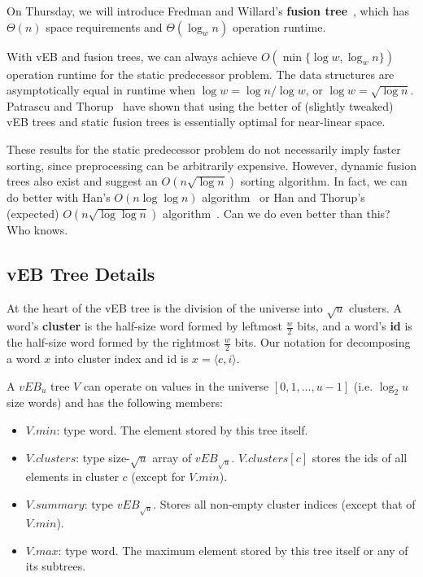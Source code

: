 \documentclass[11pt]{article}
\def\<{\langle}
\def\>{\rangle}
\begin{document}
On Thursday, we will introduce Fredman and Willard's \textbf{fusion tree}~\cite{fwJCS93}, which has $\Theta(n)$ space requirements and $\Theta(\log_w n)$ operation runtime.

With vEB and fusion trees, we can always achieve $O(\min\{\log w, \log_w n\})$ operation runtime for the static predecessor problem. The data structures are asymptotically equal in runtime when $\log w = \log n / \log w$, or $\log w = \sqrt{\log n}$. Patrascu and Thorup~\cite{ptSTOC06, ptSODA07} have shown that using the better of (slightly tweaked) vEB trees and static fusion trees is essentially optimal for near-linear space.

These results for the static predecessor problem do not necessarily imply faster sorting, since preprocessing can be arbitrarily expensive. However, dynamic fusion trees also exist and suggest an $O(n \sqrt{\log n})$ sorting algorithm. In fact, we can do better with Han's $O(n \log \log n)$ algorithm~\cite{hanSTOC02} or Han and Thorup's (expected) $O(n \sqrt{\log \log n})$ algorithm~\cite{htFOCS02}. Can we do even better than this? Who knows.

\subsection{vEB Tree Details}
At the heart of the vEB tree is the division of the universe into $\sqrt{u}$ clusters. A word's \textbf{cluster} is the half-size word formed by leftmost $\frac{w}{2}$ bits, and a word's \textbf{id} is the half-size word formed by the rightmost $\frac{w}{2}$ bits. Our notation for decomposing a word $x$ into cluster index and id is $x = \<c, i\>$.

A $vEB_u$ tree $V$ can operate on values in the universe $[0, 1, ..., u - 1]$ (i.e. $\log_2 u$ size words) and has the following members:
\begin{itemize}
\item $V.min$: type word. The element stored by this tree itself.
\item $V.clusters$: type size-$\sqrt{u}$ array of $vEB_{\sqrt{u}}$. $V.clusters[c]$ stores the ids of all elements in cluster $c$ (except for $V.min$).
\item $V.summary$: type $vEB_{\sqrt{u}}$. Stores all non-empty cluster indices (except that of $V.min$).
\item $V.max$: type word. The maximum element stored by this tree itself or any of its subtrees.
\end{itemize}
\end{document}
